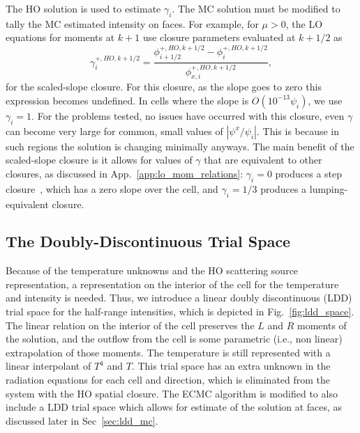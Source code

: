 The HO solution is used to estimate $\gamma_i$. The MC solution must be modified
to tally the MC estimated intensity on faces. For example, for $\mu>0$, the LO equations for
moments at $k+1$ use closure parameters evaluated at $k+1/2$ as
\begin{equation}
    \gamma_i^{+,HO,k+1/2} = \frac{\phi_{i+1/2}^{+,HO,k+1/2} -
    \phi_{i}^{+,HO,k+1/2}}{\phi_{x,i}^{+,HO,k+1/2}},
\end{equation}
for the scaled-slope closure.  For this closure, as the slope goes to zero this expression
becomes undefined.  In cells where the slope is $O(10^{-13} \psi_i)$, we use $\gamma_i=1$.
For the problems tested, no issues have occurred with this closure, even $\gamma$
can become very large for common, small values of $|\psi^x/\psi_i|$.  This is because in
such regions the solution is changing minimally anyways. 
The main benefit of the scaled-slope closure is it allows for values of $\gamma$ that are
equivalent to other closures, as discussed in App.~\ref{app:lo_mom_relations}:
$\gamma_i=0$ produces a step closure~\cite{larsen_edl}, which has a zero slope over the cell, and $\gamma_i=1/3$
produces a lumping-equivalent closure. 

\subsection{The Doubly-Discontinuous Trial Space}

Because of the temperature unknowns and the HO scattering source representation, a
representation on the interior of the cell for the temperature and intensity is needed.
Thus, we introduce a linear doubly discontinuous (LDD) trial space
for the half-range intensities, which is depicted in Fig.~\ref{fig:ldd_space}.  The linear
relation on the interior of the cell preserves the $L$ and $R$ moments of the solution,
and the outflow from the cell is some parametric (i.e., non linear) extrapolation of
those moments. 
The temperature is still represented with a linear interpolant of $T^4$ and $T$.  This
trial space has an extra unknown in the radiation equations for each cell and direction, which is eliminated
from the system with the HO spatial closure.  The ECMC algorithm is modified to also
include a LDD trial space which allows for estimate of the solution at faces, as discussed
later in Sec~\ref{sec:ldd_mc}. 


